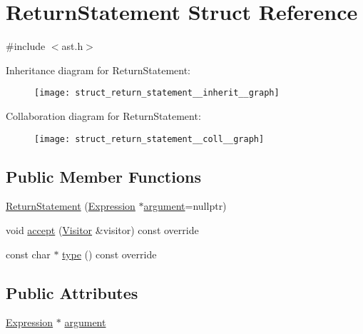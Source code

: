 \hypertarget{struct_return_statement}{}\section{Return\+Statement Struct Reference}
\label{struct_return_statement}


{\ttfamily \#include $<$ast.\+h$>$}



Inheritance diagram for Return\+Statement\+:
\nopagebreak
\begin{figure}[H]
\begin{center}
\leavevmode
\texttt{[image: struct\_return\_statement\_\_inherit\_\_graph]}
\end{center}
\end{figure}


Collaboration diagram for Return\+Statement\+:
\nopagebreak
\begin{figure}[H]
\begin{center}
\leavevmode
\texttt{[image: struct\_return\_statement\_\_coll\_\_graph]}
\end{center}
\end{figure}
\subsection*{Public Member Functions}
\begin{DoxyCompactItemize}
\item 
\hyperlink{struct_return_statement_ac2932e3a360cb4399de2f6235e64081a}{Return\+Statement} (\hyperlink{struct_expression}{Expression} $\ast$\hyperlink{struct_return_statement_aeead2cb2bcecfed685d54bb7ee5456f2}{argument}=nullptr)
\item 
void \hyperlink{struct_return_statement_af266bfb192300eeffc2d7454b019dd1a}{accept} (\hyperlink{struct_visitor}{Visitor} \&visitor) const override
\item 
const char $\ast$ \hyperlink{struct_return_statement_a4eff2224709e229d34fa4643f708a3a7}{type} () const override
\end{DoxyCompactItemize}
\subsection*{Public Attributes}
\begin{DoxyCompactItemize}
\item 
\hyperlink{struct_expression}{Expression} $\ast$ \hyperlink{struct_return_statement_aeead2cb2bcecfed685d54bb7ee5456f2}{argument}
\end{DoxyCompactItemize}


